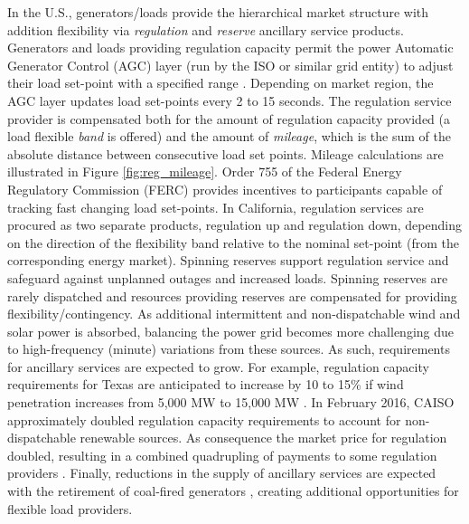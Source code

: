 \documentclass[11pt,twoside]{article}
\begin{document}
In the U.S., generators/loads provide the hierarchical market structure with addition flexibility via \emph{regulation} and \emph{reserve} ancillary service products. Generators and loads providing regulation capacity permit the power Automatic Generator Control (AGC) layer (run by the ISO or similar grid entity) to adjust their load set-point with a specified range \cite{Jaleeli1992}. Depending on market region, the AGC layer updates load set-points every 2 to 15 seconds. The regulation service provider is compensated both for the amount of regulation capacity provided (a load flexible \emph{band} is offered) and the amount of \emph{mileage}, which is the sum of the absolute distance between consecutive load set points. Mileage calculations are illustrated in Figure \ref{fig:reg_mileage}.  Order 755 of the Federal Energy Regulatory Commission (FERC) provides incentives to participants capable of tracking fast changing load set-points. In California, regulation services are procured as two separate products, regulation up and regulation down, depending on the direction of the flexibility band relative to the nominal set-point (from the corresponding energy market). Spinning reserves support regulation service and safeguard against unplanned outages and increased loads. Spinning reserves are rarely dispatched and resources providing reserves are compensated for providing flexibility/contingency. As additional intermittent and non-dispatchable wind and solar power is absorbed, balancing the power grid becomes more challenging due to high-frequency (minute) variations from these sources. As such, requirements for ancillary services are expected to grow. For example, regulation capacity requirements for Texas are anticipated to increase by 10 to 15\% if wind penetration increases from 5,000 MW to 15,000 MW \cite{Walling2008}. In February 2016, CAISO approximately doubled regulation capacity requirements to account for non-dispatchable renewable sources. As consequence the market price for regulation doubled, resulting in a combined quadrupling of payments to some regulation providers \cite{RTO_Insider}. Finally, reductions in the supply of ancillary services are expected with the retirement of coal-fired generators \cite{Kirby2011}, creating additional opportunities for flexible load providers.
\end{document}
